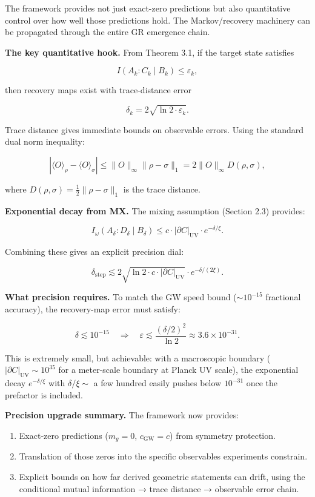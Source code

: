The framework provides not just exact-zero predictions but also quantitative control over how well those predictions hold. The Markov/recovery machinery can be propagated through the entire GR emergence chain.

\textbf{The key quantitative hook.} From Theorem 3.1, if the target state satisfies

\[
I(A_k : C_k \mid B_k) \le \varepsilon_k,
\]

then recovery maps exist with trace-distance error

\[
\delta_k = 2\sqrt{\ln 2 \cdot \varepsilon_k}.
\]

Trace distance gives immediate bounds on observable errors. Using the standard dual norm inequality:

\[
|\langle O \rangle_\rho - \langle O \rangle_\sigma|
\le \|O\|_\infty \|\rho - \sigma\|_1 = 2 \|O\|_\infty D(\rho, \sigma),
\]

where \(D(\rho, \sigma) = \frac{1}{2}\|\rho - \sigma\|_1\) is the trace distance.

\textbf{Exponential decay from MX.} The mixing assumption (Section 2.3) provides:

\[
I_\omega(A_\delta : D_\delta \mid B_\delta)
\le c \cdot |\partial C|_{\mathrm{UV}} \cdot e^{-\delta/\xi}.
\]

Combining these gives an explicit precision dial:

\[
\delta_{\mathrm{step}} \lesssim 2\sqrt{\ln 2 \cdot c \cdot |\partial C|_{\mathrm{UV}}}
\cdot e^{-\delta/(2\xi)}.
\]

\textbf{What precision requires.} To match the GW speed bound (\(\sim 10^{-15}\) fractional accuracy), the recovery-map error must satisfy:

\[
\delta \lesssim 10^{-15}
\quad \Rightarrow \quad
\varepsilon \lesssim \frac{(\delta/2)^2}{\ln 2} \approx 3.6 \times 10^{-31}.
\]

This is extremely small, but achievable: with a macroscopic boundary (\(|\partial C|_{\mathrm{UV}} \sim 10^{35}\) for a meter-scale boundary at Planck UV scale), the exponential decay \(e^{-\delta/\xi}\) with \(\delta/\xi \sim\) a few hundred easily pushes below \(10^{-31}\) once the prefactor is included.

\textbf{Precision upgrade summary.} The framework now provides:

\begin{enumerate}
\def\labelenumi{\arabic{enumi}.}
\tightlist
\item
  Exact-zero predictions (\(m_g = 0\), \(c_{\mathrm{GW}} = c\)) from symmetry protection.
\item
  Translation of those zeros into the specific observables experiments constrain.
\item
  Explicit bounds on how far derived geometric statements can drift, using the conditional mutual information → trace distance → observable error chain.
\end{enumerate}

